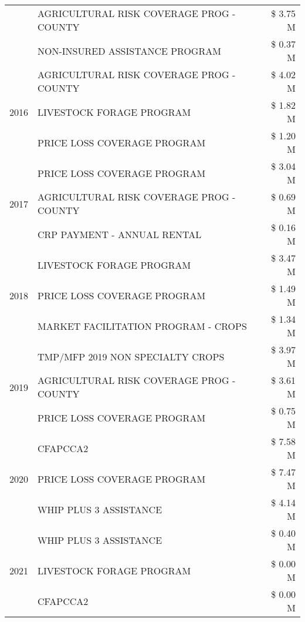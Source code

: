 \begin{tabular}{llr}
 & AGRICULTURAL RISK COVERAGE PROG - COUNTY & \$ 3.75 M \\
 & NON-INSURED ASSISTANCE PROGRAM & \$ 0.37 M \\
\cline{1-3}
\multirow[t]{3}{*}{2016} & AGRICULTURAL RISK COVERAGE PROG - COUNTY & \$ 4.02 M \\
 & LIVESTOCK FORAGE PROGRAM & \$ 1.82 M \\
 & PRICE LOSS COVERAGE PROGRAM & \$ 1.20 M \\
\cline{1-3}
\multirow[t]{3}{*}{2017} & PRICE LOSS COVERAGE PROGRAM & \$ 3.04 M \\
 & AGRICULTURAL RISK COVERAGE PROG - COUNTY & \$ 0.69 M \\
 & CRP PAYMENT - ANNUAL RENTAL & \$ 0.16 M \\
\cline{1-3}
\multirow[t]{3}{*}{2018} & LIVESTOCK FORAGE PROGRAM & \$ 3.47 M \\
 & PRICE LOSS COVERAGE PROGRAM & \$ 1.49 M \\
 & MARKET FACILITATION PROGRAM - CROPS & \$ 1.34 M \\
\cline{1-3}
\multirow[t]{3}{*}{2019} & TMP/MFP 2019 NON SPECIALTY CROPS & \$ 3.97 M \\
 & AGRICULTURAL RISK COVERAGE PROG - COUNTY & \$ 3.61 M \\
 & PRICE LOSS COVERAGE PROGRAM & \$ 0.75 M \\
\cline{1-3}
\multirow[t]{3}{*}{2020} & CFAPCCA2 & \$ 7.58 M \\
 & PRICE LOSS COVERAGE PROGRAM & \$ 7.47 M \\
 & WHIP PLUS 3 ASSISTANCE & \$ 4.14 M \\
\cline{1-3}
\multirow[t]{3}{*}{2021} & WHIP PLUS 3 ASSISTANCE & \$ 0.40 M \\
 & LIVESTOCK FORAGE PROGRAM & \$ 0.00 M \\
 & CFAPCCA2 & \$ 0.00 M \\
\cline{1-3}
\bottomrule
\end{tabular}
